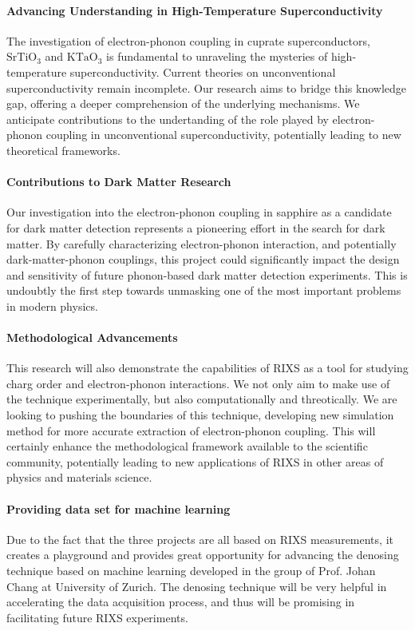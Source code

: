\documentclass[11pt]{article}
\begin{document}
\paragraph{Advancing Understanding in High-Temperature Superconductivity}
The investigation of electron-phonon coupling in cuprate superconductors, $\mathrm{SrTiO_{3}}$ and $\mathrm{KTaO_{3}}$ is fundamental to unraveling the mysteries of high-temperature superconductivity. Current theories on unconventional superconductivity remain incomplete. Our research aims to bridge this knowledge gap, offering a deeper comprehension of the underlying mechanisms. We anticipate contributions to the undertanding of the role played by electron-phonon coupling in unconventional superconductivity, potentially leading to new theoretical frameworks. 

\paragraph{Contributions to Dark Matter Research}
Our investigation into the electron-phonon coupling in sapphire as a candidate for dark matter detection represents a pioneering effort in the search for dark matter. By carefully characterizing electron-phonon interaction, and potentially dark-matter-phonon couplings, this project could significantly impact the design and sensitivity of future phonon-based dark matter detection experiments. This is undoubtly the first step towards unmasking one of the most important problems in modern physics.

\paragraph{Methodological Advancements}
This research will also demonstrate the capabilities of RIXS as a tool for studying charg order and electron-phonon interactions. We not only aim to make use of the technique experimentally, but also computationally and threotically. We are looking to pushing the boundaries of this technique, developing new simulation method for more accurate extraction of electron-phonon coupling. This will certainly enhance the methodological framework available to the scientific community, potentially leading to new applications of RIXS in other areas of physics and materials science.

\paragraph{Providing data set for machine learning}
Due to the fact that the three projects are all based on RIXS measurements, it creates a playground and provides great opportunity for advancing the denosing technique based on machine learning developed in the group of Prof. Johan Chang at University of Zurich. The denosing technique will be very helpful in accelerating the data acquisition process, and thus will be promising in facilitating future RIXS experiments.





\end{document}
